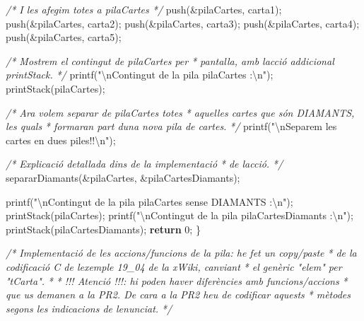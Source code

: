 \documentclass[]{book}
\newenvironment{Shaded}{\begin{snugshade}}{\end{snugshade}}
\newcommand{\CommentTok}[1]{\textcolor[rgb]{0.56,0.35,0.01}{\textit{#1}}}
\newcommand{\ControlFlowTok}[1]{\textcolor[rgb]{0.13,0.29,0.53}{\textbf{#1}}}
\newcommand{\DecValTok}[1]{\textcolor[rgb]{0.00,0.00,0.81}{#1}}
\newcommand{\NormalTok}[1]{#1}
\newcommand{\SpecialCharTok}[1]{\textcolor[rgb]{0.00,0.00,0.00}{#1}}
\newcommand{\StringTok}[1]{\textcolor[rgb]{0.31,0.60,0.02}{#1}}
\begin{document}
\begin{Shaded}
\begin{Highlighting}[]
    \CommentTok{/* I les afegim totes a pilaCartes */}
\NormalTok{    push(\&pilaCartes, carta1);}
\NormalTok{    push(\&pilaCartes, carta2);}
\NormalTok{    push(\&pilaCartes, carta3);}
\NormalTok{    push(\&pilaCartes, carta4);}
\NormalTok{    push(\&pilaCartes, carta5);}
    
    \CommentTok{/* Mostrem el contingut de pilaCartes per}
\CommentTok{     * pantalla, amb l\textquotesingle{}acció addicional printStack. }
\CommentTok{     */}
\NormalTok{    printf(}\StringTok{"}\SpecialCharTok{\textbackslash{}n}\StringTok{Contingut de la pila \textquotesingle{}pilaCartes\textquotesingle{} :}\SpecialCharTok{\textbackslash{}n}\StringTok{"}\NormalTok{);}
\NormalTok{    printStack(pilaCartes);}
    
    \CommentTok{/* Ara volem separar de pilaCartes totes }
\CommentTok{     * aquelles cartes que són DIAMANTS, les quals}
\CommentTok{     * formaran part d\textquotesingle{}una nova pila de cartes. }
\CommentTok{     */}
\NormalTok{    printf(}\StringTok{"}\SpecialCharTok{\textbackslash{}n}\StringTok{Separem les cartes en dues piles!!}\SpecialCharTok{\textbackslash{}n}\StringTok{"}\NormalTok{);}
    
    \CommentTok{/* Explicació detallada dins de la implementació}
\CommentTok{     * de l\textquotesingle{}acció. }
\CommentTok{     */}
\NormalTok{    separarDiamants(\&pilaCartes, \&pilaCartesDiamants);}
    
\NormalTok{    printf(}\StringTok{"}\SpecialCharTok{\textbackslash{}n}\StringTok{Contingut de la pila \textquotesingle{}pilaCartes\textquotesingle{} sense DIAMANTS :}\SpecialCharTok{\textbackslash{}n}\StringTok{"}\NormalTok{);}
\NormalTok{    printStack(pilaCartes);}
\NormalTok{    printf(}\StringTok{"}\SpecialCharTok{\textbackslash{}n}\StringTok{Contingut de la pila \textquotesingle{}pilaCartesDiamants\textquotesingle{} :}\SpecialCharTok{\textbackslash{}n}\StringTok{"}\NormalTok{);}
\NormalTok{    printStack(pilaCartesDiamants);}
    \ControlFlowTok{return} \DecValTok{0}\NormalTok{;}
\NormalTok{\}}

\CommentTok{/* Implementació de les accions/funcions de la pila: he fet un copy/paste}
\CommentTok{ * de la codificació C de l\textquotesingle{}exemple 19\_04 de la xWiki, canviant}
\CommentTok{ * el genèric "elem" per "tCarta". }
\CommentTok{ *}
\CommentTok{ * !!! Atenció !!!: hi poden haver diferències amb funcions/accions }
\CommentTok{ * que us demanen a la PR2. De cara a la PR2 heu de codificar aquests}
\CommentTok{ * mètodes segons les indicacions de l\textquotesingle{}enunciat. }
\CommentTok{ */}


\end{Highlighting}
\end{Shaded}
\end{document}
